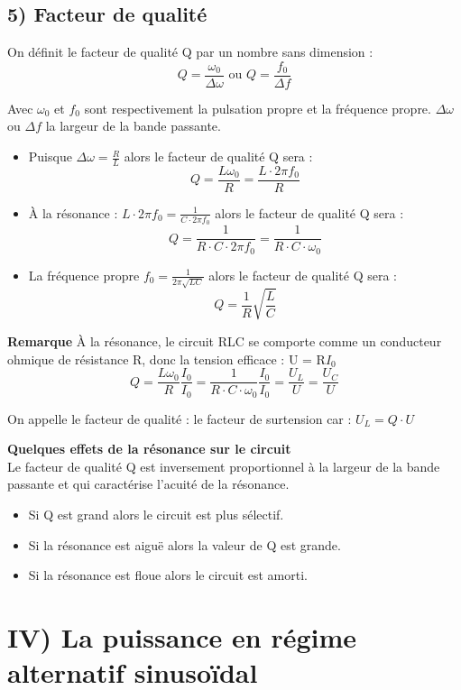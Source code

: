 \documentclass[12pt]{article}
\begin{document}
\subsection*{5) Facteur de qualité}
On définit le facteur de qualité Q par un nombre sans dimension : 
\[ Q = \frac{\omega_0}{\Delta\omega} \text{ ou } Q = \frac{f_0}{\Delta f} \]

Avec $\omega_0$ et $f_0$ sont respectivement la pulsation propre et la fréquence propre. $\Delta\omega$ ou $\Delta f$ la largeur de la bande passante.

\begin{itemize}
\item Puisque $\Delta\omega = \frac{R}{L}$ alors le facteur de qualité Q sera : 
\[ Q = \frac{L\omega_0}{R} = \frac{L\cdot2\pi f_0}{R} \]
\item À la résonance : $L\cdot2\pi f_0 = \frac{1}{C\cdot2\pi f_0}$ alors le facteur de qualité Q sera : 
\[ Q = \frac{1}{R\cdot C\cdot2\pi f_0} = \frac{1}{R\cdot C\cdot\omega_0} \]
\item La fréquence propre $f_0 = \frac{1}{2\pi\sqrt{LC}}$ alors le facteur de qualité Q sera : 
\[ Q = \frac{1}{R}\sqrt{\frac{L}{C}} \]
\end{itemize}

\textbf{Remarque}
À la résonance, le circuit RLC se comporte comme un conducteur ohmique de résistance R, donc la tension efficace : U = R$I_0$
\[ Q = \frac{L\omega_0}{R}\frac{I_0}{I_0} = \frac{1}{R\cdot C\cdot\omega_0}\frac{I_0}{I_0} = \frac{U_L}{U} = \frac{U_C}{U} \]

On appelle le facteur de qualité : le facteur de surtension car : $U_L = Q\cdot U$

\textbf{Quelques effets de la résonance sur le circuit}\\
Le facteur de qualité Q est inversement proportionnel à la largeur de la bande passante et qui caractérise l'acuité de la résonance.
\begin{itemize}
\item Si Q est grand alors le circuit est plus sélectif.
\item Si la résonance est aiguë alors la valeur de Q est grande.
\item Si la résonance est floue alors le circuit est amorti.
\end{itemize}



\section*{IV) La puissance en régime alternatif sinusoïdal}
\end{document}
